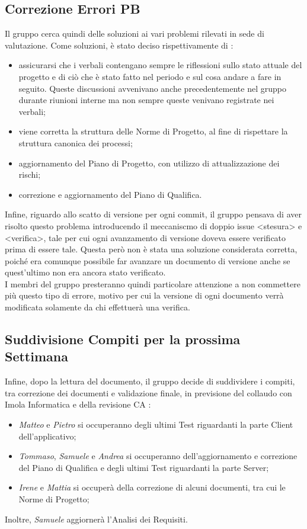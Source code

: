 \subsection{Correzione Errori PB}
Il gruppo cerca quindi delle soluzioni ai vari problemi rilevati in sede di valutazione. Come soluzioni, è stato deciso rispettivamente di :
\begin{itemize}
  \item assicurarsi che i verbali contengano sempre le riflessioni sullo stato attuale del progetto e di ciò che è stato fatto nel periodo e sul cosa andare a fare in seguito. 
  Queste discussioni avvenivano anche precedentemente nel gruppo durante riunioni interne ma non sempre queste venivano registrate nei verbali;
  \item viene corretta la struttura delle Norme di Progetto, al fine di rispettare la struttura canonica dei processi;
  \item aggiornamento del Piano di Progetto, con utilizzo di attualizzazione dei rischi;
  \item correzione e aggiornamento del Piano di Qualifica.
\end{itemize}
Infine, riguardo allo scatto di versione per ogni commit, il gruppo pensava di aver risolto questo problema introducendo il meccaniscmo di doppio issue <stesura> e <verifica>, tale per cui ogni
avanzamento di versione doveva essere verificato prima di essere tale. Questa però non è stata una soluzione considerata corretta, poiché era comunque possibile far avanzare un documento di versione anche se 
quest'ultimo non era ancora stato verificato. \\
I membri del gruppo presteranno quindi particolare attenzione a non commettere più questo tipo di errore, motivo per cui la versione di ogni documento verrà modificata solamente da chi effettuerà una verifica. 


\subsection{Suddivisione Compiti per la prossima Settimana}
Infine, dopo la lettura del documento, il gruppo decide di suddividere i compiti, tra correzione dei documenti e validazione finale, in previsione del collaudo con Imola Informatica e della revisione CA :
\begin{itemize}
  \item \textit{Matteo} e \textit{Pietro} si occuperanno degli ultimi Test riguardanti la parte Client \\ dell'applicativo;
  \item \textit{Tommaso}, \textit{Samuele} e \textit{Andrea} si occuperanno dell'aggiornamento e correzione del Piano di Qualifica e degli ultimi Test riguardanti la parte Server;
  \item \textit{Irene} e \textit{Mattia} si occuperà della correzione di alcuni documenti, tra cui le Norme di Progetto;
\end{itemize}
Inoltre, \textit{Samuele} aggiornerà l'Analisi dei Requisiti.
